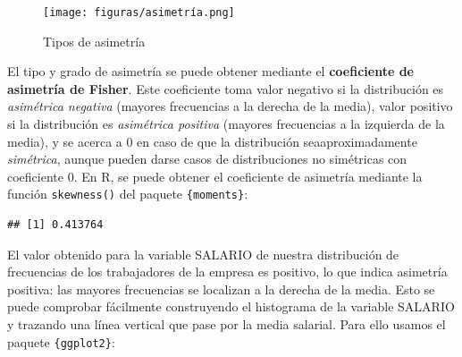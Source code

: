 \documentclass[
]{book}
\newenvironment{Shaded}{\begin{snugshade}}{\end{snugshade}}
\newcommand{\CommentTok}[1]{\textcolor[rgb]{0.56,0.35,0.01}{\textit{#1}}}
\newcommand{\FunctionTok}[1]{\textcolor[rgb]{0.13,0.29,0.53}{\textbf{#1}}}
\newcommand{\NormalTok}[1]{#1}
\newcommand{\OtherTok}[1]{\textcolor[rgb]{0.56,0.35,0.01}{#1}}
\newcommand{\SpecialCharTok}[1]{\textcolor[rgb]{0.81,0.36,0.00}{\textbf{#1}}}
\begin{document}
\begin{figure}
\centering
\texttt{[image: figuras/asimetría.png]}
\caption{Tipos de asimetría}
\end{figure}

El tipo y grado de asimetría se puede obtener mediante el \textbf{coeficiente de asimetría de Fisher}.
Este coeficiente toma valor negativo si la distribución es \emph{asimétrica negativa} (mayores frecuencias a la derecha de la media), valor positivo si la distribución es \emph{asimétrica positiva} (mayores frecuencias a la izquierda de la media), y se acerca a 0 en caso de que la distribución seaaproximadamente \emph{simétrica}, aunque pueden darse casos de distribuciones no simétricas con coeficiente 0.
En R, se puede obtener el coeficiente de asimetría mediante la función \texttt{skewness()} del paquete \texttt{\{moments\}}:

\begin{Shaded}
\end{Shaded}

\begin{verbatim}
## [1] 0.413764
\end{verbatim}

El valor obtenido para la variable SALARIO de nuestra distribución de frecuencias de los trabajadores de la empresa es positivo, lo que indica asimetría positiva: las mayores frecuencias se localizan a la derecha de la media.
Esto se puede comprobar fácilmente construyendo el histograma de la variable SALARIO y trazando una línea vertical que pase por la media salarial.
Para ello usamos el paquete \texttt{\{ggplot2\}}:
\end{document}
